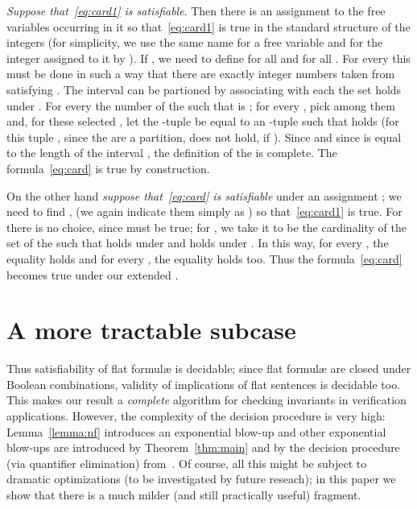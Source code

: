 \documentclass[11pt,a4paper]{article}
\newcommand{\formulae}{formul\ae\xspace}
\begin{document}
\emph{Suppose that~\eqref{eq:card1} is satisfiable}. Then there is an assignment  to the  free variables occurring in it so that~\eqref{eq:card1} is true 
in the standard structure of the integers (for simplicity, we use the same name for a free variable and for the integer assigned to it by ). If ,
we need to define  for all  and for all .
For every  this must be done in such a way that there are exactly  integer numbers  taken from  satisfying .
The interval  can be partioned by associating with each  the set  
 holds under . For every  the number of the  such that  is ; for every , pick  among them and, for these selected ,  let the -tuple  be equal to an -tuple  such that  holds (for this tuple , since the  are a partition,  does not hold, if ).
Since  and since  is equal to the length of the interval , the definition of the  is
complete. The formula~\eqref{eq:card} is true by construction.



On the other hand \emph{suppose that~\eqref{eq:card} is satisfiable} under an assignment ; we need to find ,  
(we again indicate them simply as )
so that~\eqref{eq:card1} is true. For  there is no choice, since  must be true; for , we take it to be the cardinality of the set of the 
 such that  holds under  and  holds under . In this way, 
for every , the equality  holds and for every , the equality
 holds too. Thus the formula~\eqref{eq:card} becomes true under our extended .
 



\section{A more tractable subcase}\label{sec:tractable}

Thus satisfiability of flat \formulae is decidable; since flat \formulae are closed under Boolean combinations, validity of implications of flat sentences 
is decidable too. This makes
our
result a \emph{complete} algorithm for checking invariants in verification applications.
However, the complexity of the decision procedure is very high:  Lemma~\ref{lemma:nf} introduces an exponential blow-up and other 
exponential blow-ups are introduced by Theorem~\ref{thm:main}
and by the
decision procedure (via quantifier elimination)  from~\cite{schweikhart}. 
Of course, all this might be subject to dramatic optimizations (to be investigated by future reseach); in this paper we show  that there is 
 a much milder 
(and still practically useful) fragment.
\end{document}
